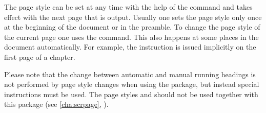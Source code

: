 The page style can be set at any time with the help of the
 command and takes effect with the next page that is
output. Usually one sets the page style only once at the beginning of the
document or in the preamble. To change the page style of the current
page one uses the  command. This also happens at
some places in the document automatically. For example, the
instruction  is issued
implicitly on the first page of a chapter.

Please note that the change between automatic and manual running
headings is not performed by page style changes when using the
 package, but instead special instructions must be
used. The page styles  and  should
not be used together with this package (see
\autoref{cha:scrpage},
).
%
%
%
%
%
%
%

